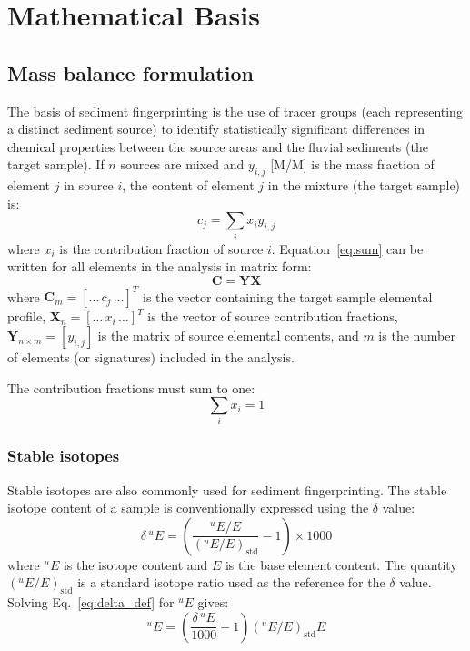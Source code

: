 \chapter{Mathematical Basis}\label{sec:basic_concepts}

\section{Mass balance formulation}
The basis of sediment fingerprinting is the use of tracer groups (each representing a distinct sediment source) to identify statistically significant differences in chemical properties between the source areas and the fluvial sediments (the target sample). If $n$ sources are mixed and $y_{i,j}$ [M/M] is the mass fraction of element $j$ in source $i$, the content of element $j$ in the mixture (the target sample) is:
\begin{equation}\label{eq:sum}
    c_j = \sum_i x_i y_{i,j}
\end{equation}
where $x_i$ is the contribution fraction of source $i$. Equation~\eqref{eq:sum} can be written for all elements in the analysis in matrix form:
\begin{equation}\label{eq:mass_balance_matrix}
    \mathbf{C} = \mathbf{Y} \mathbf{X}
\end{equation}
where $\mathbf{C}_{m} = [\dots\, c_j\, \dots]^T$ is the vector containing the target sample elemental profile, $\mathbf{X}_{n} = [\dots\, x_i\, \dots]^T$ is the vector of source contribution fractions, $\mathbf{Y}_{n \times m} = [y_{i,j}]$ is the matrix of source elemental contents, and $m$ is the number of elements (or signatures) included in the analysis.

The contribution fractions must sum to one:
\begin{equation}\label{eq:sum_constraint}
    \sum_i x_i = 1
\end{equation}

\subsection{Stable isotopes}\label{sec:stable-isotopes}
Stable isotopes are also commonly used for sediment fingerprinting. The stable isotope content of a sample is conventionally expressed using the $\delta$ value:
\begin{equation}\label{eq:delta_def}
    \delta\,{}^{u}E = \left(\frac{{}^{u}E/E}{\left({}^{u}E/E\right)_{\mathrm{std}}} - 1\right) \times 1000
\end{equation}
where ${}^{u}E$ is the isotope content and $E$ is the base element content. The quantity $\left({}^{u}E/E\right)_{\mathrm{std}}$ is a standard isotope ratio used as the reference for the $\delta$ value. Solving Eq.~\eqref{eq:delta_def} for ${}^{u}E$ gives:
\begin{equation}\label{eq:isotope_content}
    {}^{u}E = \left(\frac{\delta\,{}^{u}E}{1000} + 1\right) \left({}^{u}E/E\right)_{\mathrm{std}} E
\end{equation}

